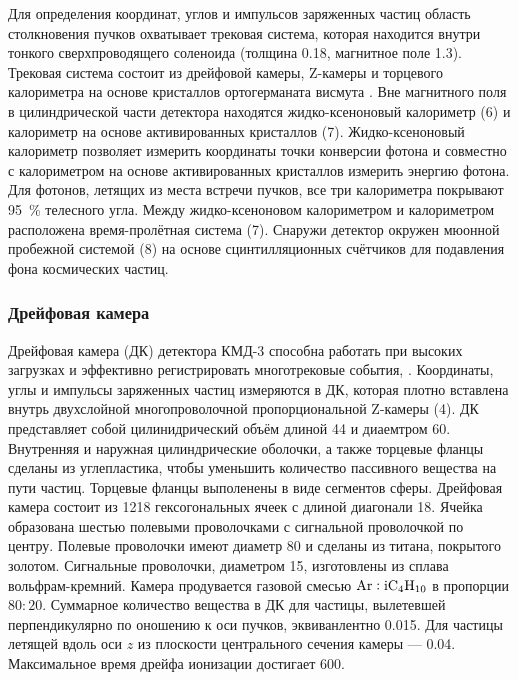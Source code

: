 Для определения координат,
углов и импульсов заряженных частиц область столкновения пучков
охватывает трековая система,
которая находится внутри тонкого сверхпроводящего соленоида (толщина
\SI{0.18}{\Xrad},
магнитное поле \SI{1.3}{\teslaru}). 
Трековая система состоит из дрейфовой камеры,
Z-камеры и торцевого калориметра на основе кристаллов ортогерманата висмута .
Вне магнитного поля в цилиндрической части детектора находятся жидко-ксеноновый калориметр (6)
и калориметр на основе активированных кристаллов (7). 
Жидко-ксеноновый калориметр позволяет измерить координаты точки конверсии фотона и совместно с калориметром на основе активированных кристаллов  измерить энергию фотона.
Для фотонов, летящих из места встречи пучков, все три калориметра покрывают \SI{95}{\percent} телесного угла.
Между жидко-ксеноновом калориметром и  калориметром расположена время-пролётная система (7).
Снаружи детектор окружен мюонной пробежной системой (8) на основе сцинтилляционных счётчиков для
подавления фона космических частиц.


\subsubsection{Дрейфовая камера}
\label{sec:dc}

Дрейфовая камера (ДК) детектора КМД-3 способна работать при высоких загрузках и эффективно регистрировать многотрековые события, \cite{driftChCMD3Grancagnolo2010}. 
Координаты, углы и импульсы заряженных частиц измеряются в ДК,
которая плотно вставлена внутрь двухслойной многопроволочной пропорциональной Z-камеры (4). 
ДК представляет собой цилинидрический объём длиной \SI{44}{\cmr} и диаемтром \SI{60}{\cmr}.
Внутренняя и наружная цилиндрические оболочки,
а также торцевые фланцы сделаны из углепластика,
чтобы уменьшить количество пассивного вещества на пути частиц.
Торцевые фланцы выполенены в виде сегментов сферы.
Дрейфовая камера состоит из \num{1218} гексогональных ячеек с длиной диагонали \SI{18}{\mmr}.
Ячейка образована шестью полевыми проволочками с сигнальной проволочкой по центру.
Полевые проволочки имеют диаметр \SI{80}{\umr} и сделаны из титана, покрытого золотом. 
Сигнальные проволочки,
диаметром \SI{15}{\umr},
изготовлены из сплава вольфрам-кремний.
Камера продувается газовой смесью $\ce{Ar}:\ce{iC4H10}$ в пропорции $80:20$.
Суммарное количество вещества в ДК для частицы,
вылетевшей перпендикулярно по оношению к оси пучков,
эквиванлентно \SI{0.015}{\Xrad}.
Для частицы летящей вдоль оси $z$ из плоскости центрального сечения камеры
--- \SI{0.04}{\Xrad}.
Максимальное время дрейфа ионизации достигает \SI{600}{\nsr}.


